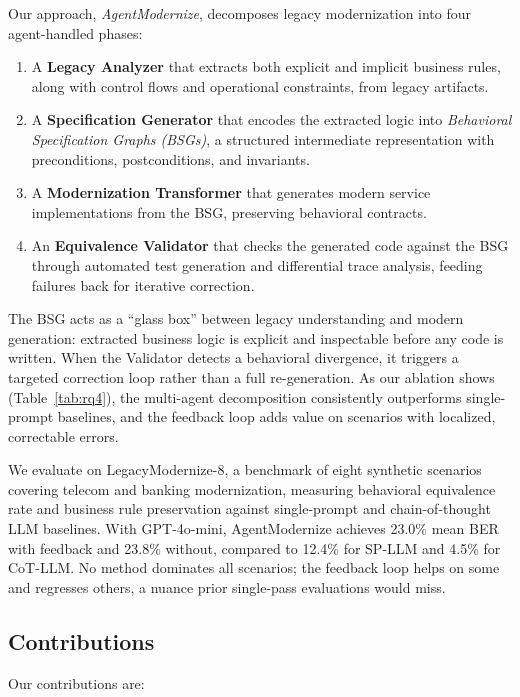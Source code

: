\documentclass[conference]{IEEEtran}
\begin{document}
Our approach, \textit{AgentModernize}, decomposes legacy modernization into four agent-handled phases:

\begin{enumerate}
    \item A \textbf{Legacy Analyzer} that extracts both explicit and implicit business rules, along with control flows and operational constraints, from legacy artifacts.
    \item A \textbf{Specification Generator} that encodes the extracted logic into \textit{Behavioral Specification Graphs (BSGs)}, a structured intermediate representation with preconditions, postconditions, and invariants.
    \item A \textbf{Modernization Transformer} that generates modern service implementations from the BSG, preserving behavioral contracts.
    \item An \textbf{Equivalence Validator} that checks the generated code against the BSG through automated test generation and differential trace analysis, feeding failures back for iterative correction.
\end{enumerate}

The BSG acts as a ``glass box'' between legacy understanding and modern generation: extracted business logic is explicit and inspectable before any code is written. When the Validator detects a behavioral divergence, it triggers a targeted correction loop rather than a full re-generation. As our ablation shows (Table~\ref{tab:rq4}), the multi-agent decomposition consistently outperforms single-prompt baselines, and the feedback loop adds value on scenarios with localized, correctable errors.

We evaluate on LegacyModernize-8, a benchmark of eight synthetic scenarios covering telecom and banking modernization, measuring behavioral equivalence rate and business rule preservation against single-prompt and chain-of-thought LLM baselines. With GPT-4o-mini, AgentModernize achieves 23.0\% mean BER with feedback and 23.8\% without, compared to 12.4\% for SP-LLM and 4.5\% for CoT-LLM. No method dominates all scenarios; the feedback loop helps on some and regresses others, a nuance prior single-pass evaluations would miss.

\subsection{Contributions}

Our contributions are:
\end{document}
